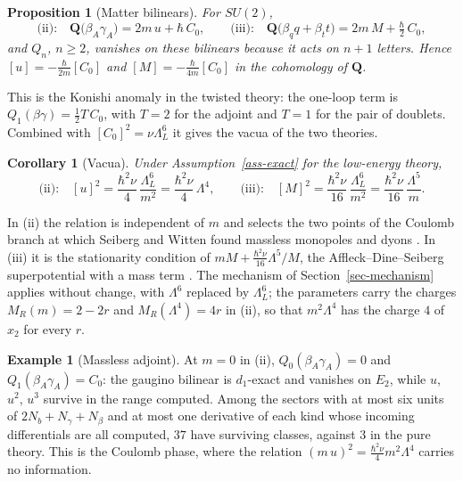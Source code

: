 \documentclass[11pt]{article}
\numberwithin{equation}{section}
\numberwithin{figure}{section}
\numberwithin{table}{section}
\newtheorem{proposition}[theorem]{Proposition}
\newtheorem{corollary}[theorem]{Corollary}
\theoremstyle{definition}
\newtheorem{example}[theorem]{Example}
\newcommand{\Qp}{\mathbf Q}
\begin{document}
\begin{proposition}[Matter bilinears]\label{prop-konishi}
For $SU(2)$,
\begin{equation}\label{eq-konishi}
\text{(ii):}\quad \Qp\big(\beta_A\gamma_A\big)=2m\,u+\hbar\,C_0,\qquad
\text{(iii):}\quad \Qp\big(\beta_qq+\beta_tt\big)=2m\,M+\tfrac{\hbar}{2}\,C_0,
\end{equation}
and $Q_n$, $n\ge2$, vanishes on these bilinears because it acts on $n+1$ letters. Hence $[u]=-\tfrac{\hbar}{2m}[C_0]$ and $[M]=-\tfrac{\hbar}{4m}[C_0]$ in the cohomology of $\Qp$.
\end{proposition}

This is the Konishi anomaly \cite{Konishi} in the twisted theory: the one-loop term is $Q_1(\beta\gamma)=\tfrac12T\,C_0$, with $T=2$ for the adjoint and $T=1$ for the pair of doublets. Combined with $[C_0]^2=\nu\Lambda_L^6$ it gives the vacua of the two theories.

\begin{corollary}[Vacua]\label{cor-vacua}
Under Assumption~\ref{ass-exact} for the low-energy theory,
\begin{equation}\label{eq-vacua}
\text{(ii):}\quad [u]^2=\frac{\hbar^2\nu}{4}\,\frac{\Lambda_L^6}{m^2}=\frac{\hbar^2\nu}{4}\,\Lambda^4,\qquad
\text{(iii):}\quad [M]^2=\frac{\hbar^2\nu}{16}\,\frac{\Lambda_L^6}{m^2}=\frac{\hbar^2\nu}{16}\,\frac{\Lambda^5}{m} .
\end{equation}
\end{corollary}

In (ii) the relation is independent of $m$ and selects the two points of the Coulomb branch at which Seiberg and Witten found massless monopoles and dyons \cite{SW}. In (iii) it is the stationarity condition of $mM+\tfrac{\hbar^2\nu}{16}\Lambda^5/M$, the Affleck--Dine--Seiberg superpotential with a mass term \cite{ADS}. The mechanism of Section~\ref{sec-mechanism} applies without change, with $\Lambda^6$ replaced by $\Lambda_L^6$; the parameters carry the charges $M_R(m)=2-2r$ and $M_R(\Lambda^4)=4r$ in (ii), so that $m^2\Lambda^4$ has the charge $4$ of $x_2$ for every $r$.

\begin{example}[Massless adjoint]\label{ex-massless}
At $m=0$ in (ii), $Q_0(\beta_A\gamma_A)=0$ and $Q_1(\beta_A\gamma_A)=C_0$: the gaugino bilinear is $d_1$-exact and vanishes on $E_2$, while $u$, $u^2$, $u^3$ survive in the range computed. Among the sectors with at most six units of $2N_b+N_\gamma+N_\beta$ and at most one derivative of each kind whose incoming differentials are all computed, $37$ have surviving classes, against $3$ in the pure theory. This is the Coulomb phase, where the relation $(m\,u)^2=\tfrac{\hbar^2\nu}{4}m^2\Lambda^4$ carries no information.
\end{example}
\end{document}
